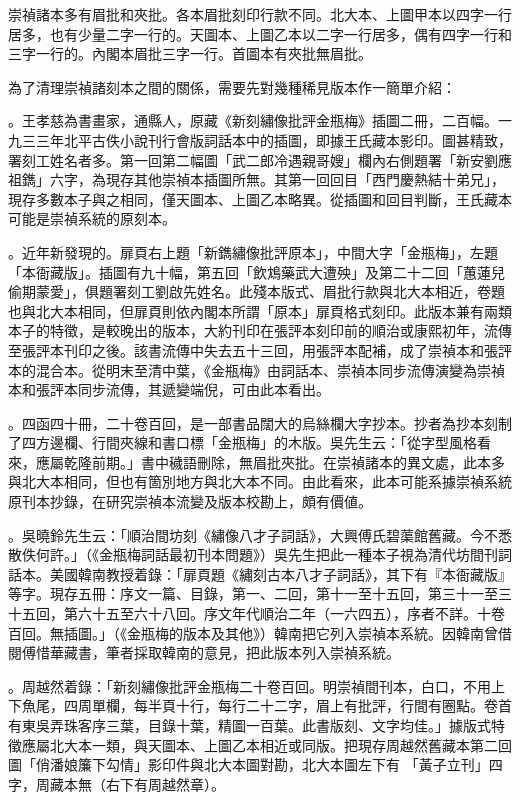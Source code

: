 崇禎諸本多有眉批和夾批。各本眉批刻印行款不同。北大本、上圖甲本以四字一行居多，也有少量二字一行的。天圖本、上圖乙本以二字一行居多，偶有四字一行和三字一行的。內閣本眉批三字一行。首圖本有夾批無眉批。

為了清理崇禎諸刻本之間的關係，需要先對幾種稀見版本作一簡單介紹：

{\large{}}。王孝慈為書畫家，通縣人，原藏《新刻繡像批評金瓶梅》插圖二冊，二百幅。一九三三年北平古佚小說刊行會版詞話本中的插圖，即據王氏藏本影印。圖甚精致，署刻工姓名者多。第一回第二幅圖「武二郎冷遇親哥嫂」欄內右側題署「新安劉應祖鐫」六字，為現存其他崇禎本插圖所無。其第一回回目「西門慶熱結十弟兄」，現存多數本子與之相同，僅天圖本、上圖乙本略異。從插圖和回目判斷，王氏藏本可能是崇禎系統的原刻本。

{\large{}}。近年新發現的。扉頁右上題「新鐫繡像批評原本」，中間大字「金瓶梅」，左題「本衙藏版」。插圖有九十幅，第五回「飲鴆藥武大遭殃」及第二十二回「蕙蓮兒偷期蒙愛」，俱題署刻工劉啟先姓名。此殘本版式、眉批行款與北大本相近，卷題也與北大本相同，但扉頁則依內閣本所謂「原本」扉頁格式刻印。此版本兼有兩類本子的特徵，是較晚出的版本，大約刊印在張評本刻印前的順治或康熙初年，流傳至張評本刊印之後。該書流傳中失去五十三回，用張評本配補，成了崇禎本和張評本的混合本。從明末至清中葉，《金瓶梅》由詞話本、崇禎本同步流傳演變為崇禎本和張評本同步流傳，其遞變端倪，可由此本看出。

{\large{}}。四函四十冊，二十卷百回，是一部書品闊大的烏絲欄大字抄本。抄者為抄本刻制了四方邊欄、行間夾線和書口標「金瓶梅」的木版。吳先生云：「從字型風格看來，應屬乾隆前期。」書中穢語刪除，無眉批夾批。在崇禎諸本的異文處，此本多與北大本相同，但也有箇別地方與北大本不同。由此看來，此本可能系據崇禎系統原刊本抄錄，在研究崇禎本流變及版本校勘上，頗有價値。

{\large{}}。吳曉鈴先生云：「順治間坊刻《繡像八才子詞話》，大興傅氏碧蕖館舊藏。今不悉散佚何許。」（《金瓶梅詞話最初刊本問題》）吳先生把此一種本子視為清代坊間刊詞話本。美國韓南教授着錄：「扉頁題《繡刻古本八才子詞話》，其下有『本衙藏版』等字。現存五冊：序文一篇、目錄，第一、二回，第十一至十五回，第三十一至三十五回，第六十五至六十八回。序文年代順治二年（一六四五），序者不詳。十卷百回。無插圖。」（《金瓶梅的版本及其他》）韓南把它列入崇禎本系統。因韓南曾借閱傅惜華藏書，筆者採取韓南的意見，把此版本列入崇禎系統。

{\large{}}。周越然着錄：「新刻繡像批評金瓶梅二十卷百回。明崇禎間刊本，白口，不用上下魚尾，四周單欄，每半頁十行，每行二十二字，眉上有批評，行間有圈點。卷首有東吳弄珠客序三葉，目錄十葉，精圖一百葉。此書版刻、文字均佳。」據版式特徵應屬北大本一類，與天圖本、上圖乙本相近或同版。把現存周越然舊藏本第二回圖「俏潘娘簾下勾情」影印件與北大本圖對勘，北大本圖左下有 「黃子立刊」四字，周藏本無（右下有周越然章）。

